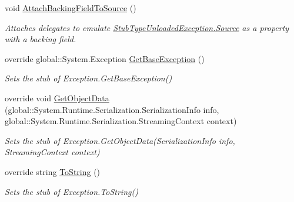 \begin{DoxyCompactItemize}
void \hyperlink{class_system_1_1_fakes_1_1_stub_type_unloaded_exception_abf7aa038225e5a315e6542c32a5b0c3f}{Attach\-Backing\-Field\-To\-Source} ()
\begin{DoxyCompactList}\small\item\em Attaches delegates to emulate \hyperlink{class_system_1_1_fakes_1_1_stub_type_unloaded_exception_aae3dc11216e4281b4cafc36dbb5bff72}{Stub\-Type\-Unloaded\-Exception.\-Source} as a property with a backing field.\end{DoxyCompactList}\item 
override global\-::\-System.\-Exception \hyperlink{class_system_1_1_fakes_1_1_stub_type_unloaded_exception_a4791566a0681a09f026b40bde084e913}{Get\-Base\-Exception} ()
\begin{DoxyCompactList}\small\item\em Sets the stub of Exception.\-Get\-Base\-Exception()\end{DoxyCompactList}\item 
override void \hyperlink{class_system_1_1_fakes_1_1_stub_type_unloaded_exception_a5d019c5f2c2e0f94591e4ced89cca6cb}{Get\-Object\-Data} (global\-::\-System.\-Runtime.\-Serialization.\-Serialization\-Info info, global\-::\-System.\-Runtime.\-Serialization.\-Streaming\-Context context)
\begin{DoxyCompactList}\small\item\em Sets the stub of Exception.\-Get\-Object\-Data(\-Serialization\-Info info, Streaming\-Context context)\end{DoxyCompactList}\item 
override string \hyperlink{class_system_1_1_fakes_1_1_stub_type_unloaded_exception_a8c0f11f7c4d4804b84233c7488e1e55e}{To\-String} ()
\begin{DoxyCompactList}\small\item\em Sets the stub of Exception.\-To\-String()\end{DoxyCompactList}\end{DoxyCompactItemize}
